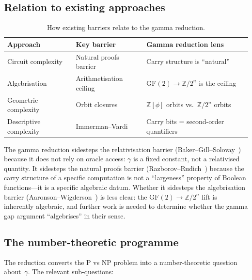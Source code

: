 \documentclass[12pt, a4paper]{article}
\theoremstyle{plain}
\theoremstyle{definition}
\theoremstyle{remark}
\newcommand{\Z}{\mathbb{Z}}
\newcommand{\GF}{\mathrm{GF}}
\newcommand{\Zphi}{\Z[\phi]}
\begin{document}
\subsection{Relation to existing approaches}

\begin{table}[ht]
\centering
\begin{tabular}{@{}lll@{}}
\toprule
\textbf{Approach} & \textbf{Key barrier} & \textbf{Gamma reduction lens} \\
\midrule
Circuit complexity & Natural proofs barrier & Carry structure is ``natural''\\
Algebrisation      & Arithmetisation ceiling & $\GF(2) \to \Z/2^n$ is the ceiling \\
Geometric complexity & Orbit closures & $\Zphi$ orbits vs.\ $\Z/2^n$ orbits \\
Descriptive complexity & Immerman--Vardi & Carry bits = second-order quantifiers \\
\bottomrule
\end{tabular}
\caption{How existing barriers relate to the gamma reduction.}
\label{tab:landscape}
\end{table}

The gamma reduction sidesteps the relativisation barrier
(Baker--Gill--Solovay~\cite{baker1975}) because it does not rely on
oracle access: $\gamma$ is a fixed constant, not a relativised quantity.
It sidesteps the natural proofs barrier
(Razborov--Rudich~\cite{razborov1997}) because the carry structure of a
specific computation is not a ``largeness'' property of Boolean
functions---it is a specific algebraic datum.  Whether it sidesteps
the algebrisation barrier (Aaronson--Wigderson~\cite{aaronson2009}) is less clear: the
$\GF(2) \to \Z/2^n$ lift is inherently algebraic, and further work
is needed to determine whether the gamma gap argument
``algebrises'' in their sense.

\subsection{The number-theoretic programme}

The reduction converts the P vs NP problem into a number-theoretic
question about~$\gamma$.  The relevant sub-questions:
\end{document}
